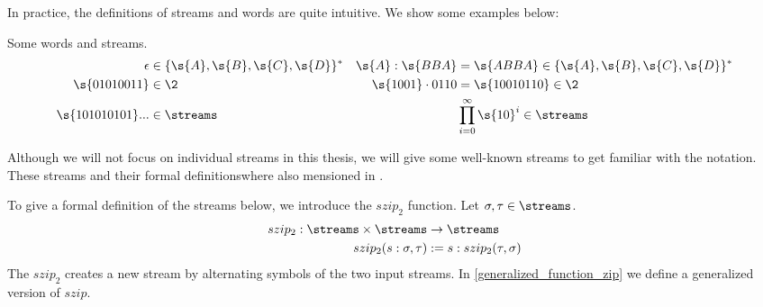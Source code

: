 In practice, the definitions of streams and words are quite intuitive. We show some examples below:

\begin{example}{Some words and streams.}
	\begin{align*}
		\epsilon &\in \{\s{A},
		\s{B},\s{C},\s{D}\}^{*} &\s{A} : \s{BBA} &= \s{ABBA} \in \{\s{A},\s{B},\s{C},\s{D}\}^{*} \\ 
		 \s{01010011}&\in\2 &\s{1001} \cdot 0110 &= \s{10010110} \in \2 \\
		 \s{101010101}... &\in\streams & \qquad &\prod_{i=0}^{\infty}\s{10}^{i}\in\streams
	\end{align*}
\end{example}

Although we will not focus on individual streams in this thesis, we will give some well-known streams to get familiar with the notation. These streams and their formal definitionswhere also mensioned in \cite{streams:degrees:2011}.

\begin{definition}
	To give a formal definition of the streams below, we introduce the $szip_2$ function. Let $\sigma,\tau\in\streams$. 
	\begin{align*}
		szip_2: \streams \times \streams &\to \streams \\
		szip_2(s : \sigma,\tau) &:= s : szip_2(\tau, \sigma)
	\end{align*}
	The $szip_2$ creates a new stream by alternating symbols of the two input streams. In \cref{generalized_function_zip} we define a generalized version of $szip$.
\end{definition}

